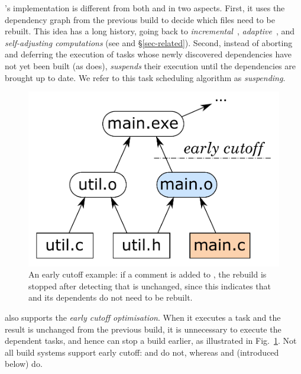 \Shake's implementation is different from both \Make and \Excel in two aspects.
First, it uses the dependency graph from the previous build to decide which
files need to be rebuilt. This idea has a long history, going back to
\emph{incremental}~\cite{demers1981incremental},
\emph{adaptive}~\cite{acar2002adaptive}, and
\emph{self-adjusting computations} (see \cite{acar2007selfadjusting} and
\S\ref{sec-related}). Second, instead of aborting and deferring the execution of
tasks whose newly discovered dependencies have not yet been built (as \Excel
does), \Shake \emph{suspends} their execution until the dependencies are brought
up to date. We refer to this task scheduling algorithm as \emph{suspending}.

\begin{figure}[h]
\vspace{-5mm}
\centerline{\includegraphics[scale=0.28]{fig/shake-example-cutoff.pdf}}
\vspace{-3mm}
\caption{An early cutoff example: if a comment is added to , the
rebuild is stopped after detecting that  is unchanged, since this
indicates that  and its dependents do not need to be
rebuilt.\label{fig-cutoff}}
\vspace{-2mm}
\end{figure}

\Shake also supports the \emph{early cutoff optimisation}. When it
executes a task and the result is unchanged from the previous build, it is
unnecessary to execute the dependent tasks, and hence \Shake can stop a build
earlier, as illustrated in Fig.~\ref{fig-cutoff}. Not all build systems support
early cutoff: \Make and \Excel do not, whereas \Shake and \Bazel (introduced
below) do.

